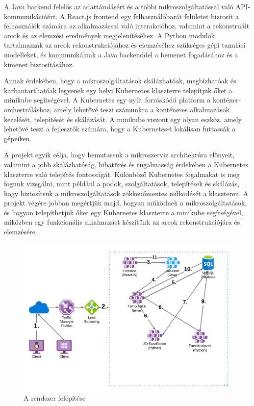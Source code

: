 \documentclass[12pt,a4]{article}
\begin{document}
            A Java backend felelős az adattárolásért és a többi mikroszolgáltatással való
            API-kommunikációért. A React.js frontend egy felhasználóbarát felületet biztosít a felhasználók számára az alkalmazással való interakcióhoz, valamint a rekonstruált arcok és az elemzési eredmények megjelenítéséhez. A Python modulok tartalmazzák az arcok rekonstrukciójához és elemzéséhez szükséges gépi tanulási modelleket, és kommunikálnak a Java backenddel a bemenet fogadásához és a kimenet biztosításához.

            Annak érdekében, hogy a mikroszolgáltatások skálázhatóak, megbízhatóak és karbantarthatóak legyenek egy helyi Kubernetes klaszterre telepítjük őket a minikube segítségével. A Kubernetes egy nyílt forráskódú platform a konténer-orchestráláshoz, amely lehetővé teszi számunkra a konténeres alkalmazások kezelését, telepítését és skálázását. A minikube viszont egy olyan eszköz, amely lehetővé teszi a fejlesztők számára, hogy a Kubernetes-t lokálisan futtassák a gépeiken.

            A projekt egyik célja, hogy bemutassuk a mikroszerviz architektúra előnyeit, valamint a jobb skálázhatóság, hibatűrés és rugalmasság érdekében a Kubernetes klaszterre való telepítés fontosságát. Különböző Kubernetes fogalmakat is meg fogunk vizsgálni, mint például a podok, szolgáltatások, telepítések és skálázás, hogy biztosítsuk a mikroszolgáltatások zökkenőmentes működését a klaszteren. A projekt végére jobban megértjük majd, hogyan működnek a mikroszolgáltatások, és hogyan telepíthetjük őket egy Kubernetes klaszterre a minikube segítségével, miközben egy funkcionális alkalmazást készítünk az arcok rekonstrukciójára és elemzésére.

            \begin{figure}[h]	
        		\centering
        		\includegraphics[width=0.7\linewidth]{sysplan}
        		\caption{ A rendszer felépítése}
        	    \label{fig:sysplan}
            \end{figure}
\end{document}
